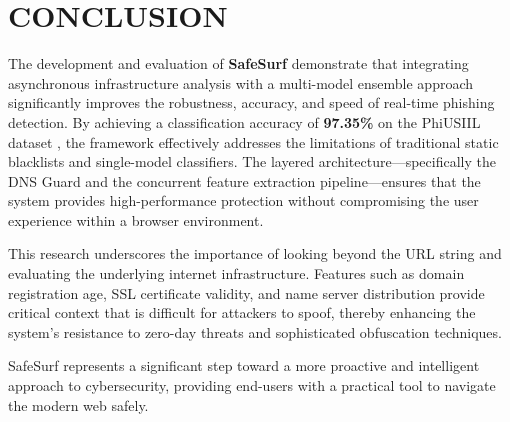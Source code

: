 \section{CONCLUSION}
\label{sec:conclusion}

The development and evaluation of \textbf{SafeSurf} demonstrate that integrating asynchronous infrastructure analysis with a multi-model ensemble approach significantly improves the robustness, accuracy, and speed of real-time phishing detection. By achieving a classification accuracy of \textbf{97.35\%} on the PhiUSIIL dataset \cite{ref10}, the framework effectively addresses the limitations of traditional static blacklists and single-model classifiers. The layered architecture—specifically the DNS Guard and the concurrent feature extraction pipeline—ensures that the system provides high-performance protection without compromising the user experience within a browser environment.

This research underscores the importance of looking beyond the URL string and evaluating the underlying internet infrastructure. Features such as domain registration age, SSL certificate validity, and name server distribution provide critical context that is difficult for attackers to spoof, thereby enhancing the system's resistance to zero-day threats and sophisticated obfuscation techniques.


SafeSurf represents a significant step toward a more proactive and intelligent approach to cybersecurity, providing end-users with a practical tool to navigate the modern web safely.
